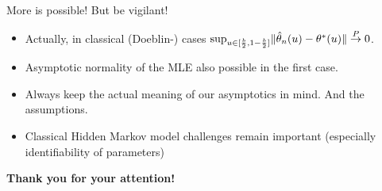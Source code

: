 	

\begin{frame}{More is possible! But be vigilant!}
	\begin{itemize}
		\item Actually, in classical (Doeblin-) cases $\sup_{u \in [\frac{b}{2}, 1- \frac{b}{2}]} \lVert\hat{\theta}_n(u) - \theta^\ast(u)\rVert \overset{P}{\to} 0$.
		\item Asymptotic normality of the MLE also possible in the first case.
		\pause
		\item Always keep the actual meaning of our asymptotics in mind. And the assumptions.
		\item Classical Hidden Markov model challenges remain important (especially identifiability of parameters)
	\end{itemize}
	\pause
	\vspace{1cm}
	
	\textbf{Thank you for your attention!}
\end{frame}